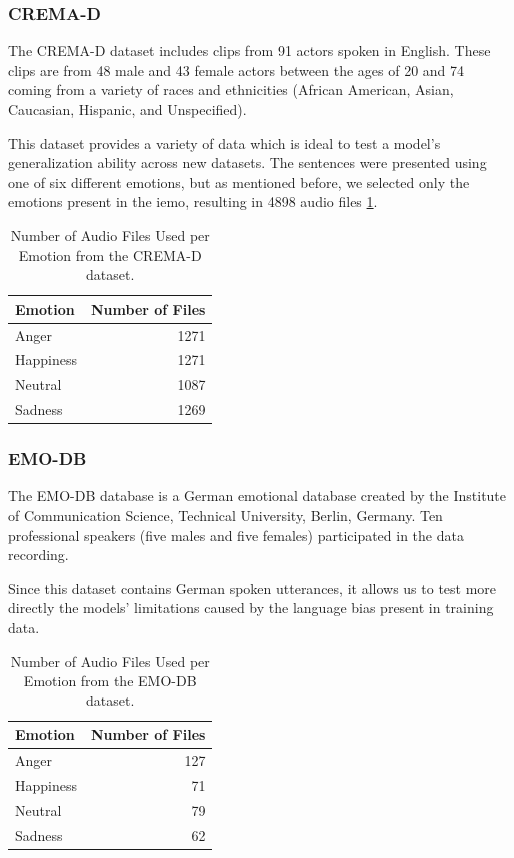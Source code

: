 \subsubsection{CREMA-D}


The CREMA-D dataset includes clips from 91 actors spoken in English. These clips are from 48 male and 43 female actors between the ages of 20 and 74 coming from a variety of races and ethnicities (African American, Asian, Caucasian, Hispanic, and Unspecified).

This dataset provides a variety of data which is ideal to test a model's generalization ability across new datasets. The sentences were presented using one of six different emotions, but as mentioned before, we selected only the emotions present in the \ac{iemo}, resulting in 4898 audio files \ref{tab:crema_files}. 

\begin{table}[H]
	\centering
	\label{tab:crema_files}
	\caption{Number of Audio Files Used per Emotion from the CREMA-D dataset.}
	\begin{tabular}{lr}
		\toprule
		Emotion     &   Number of Files \\
		\midrule
		Anger   	&              1271 \\
		Happiness   &              1271 \\
		Neutral 	&              1087 \\
		Sadness     &              1269 \\
		\bottomrule
	\end{tabular}
\end{table}

\subsubsection{EMO-DB}

The EMO-DB database is a German emotional database created by the Institute of Communication Science, Technical University, Berlin, Germany. Ten professional speakers (five males and five females) participated in the data recording.

Since this dataset contains German spoken utterances, it allows us to test more directly the models' limitations caused by the language bias present in training data.

\begin{table}[H]
	\centering
	\label{tab:emo_files}
	\caption{Number of Audio Files Used per Emotion from the EMO-DB dataset.}
	\begin{tabular}{lr}
		\toprule
		Emotion     &   Number of Files \\
		\midrule
		Anger   	&               127 \\
		Happiness   &                71 \\
		Neutral		&                79 \\
		Sadness     &                62 \\
		\bottomrule
	\end{tabular}
\end{table}


